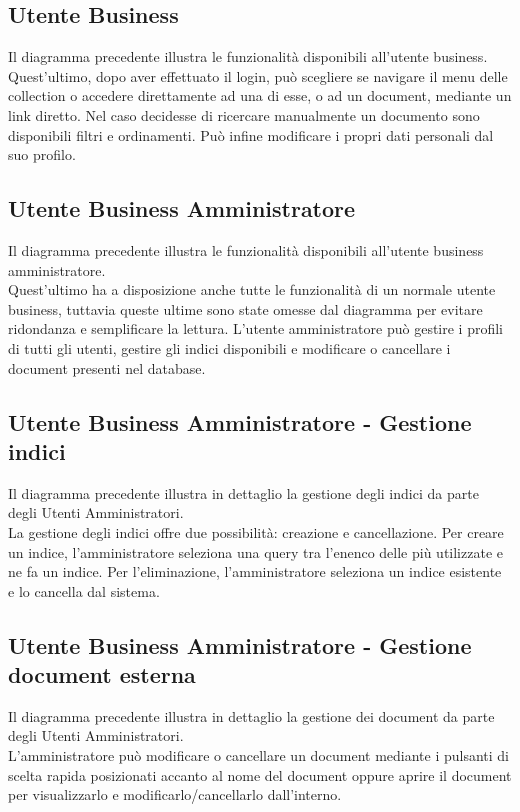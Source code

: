 
\subsection{Utente Business}
Il diagramma precedente illustra le funzionalità disponibili all'utente business.\\
Quest'ultimo, dopo aver effettuato il login, può scegliere se navigare il menu delle collection o accedere direttamente ad una di esse, o ad un document, mediante un link diretto.
Nel caso decidesse di ricercare manualmente un documento sono disponibili filtri e ordinamenti.
Può infine modificare i propri dati personali dal suo profilo.

\subsection{Utente Business Amministratore}
Il diagramma precedente illustra le funzionalità disponibili all'utente business amministratore.\\
Quest'ultimo ha a disposizione anche tutte le funzionalità di un normale utente business, tuttavia queste ultime sono state omesse dal diagramma per evitare ridondanza e semplificare la lettura.
L'utente amministratore può gestire i profili di tutti gli utenti, gestire gli indici disponibili e modificare o cancellare i document presenti nel database.

\subsection{Utente Business Amministratore - Gestione indici}
Il diagramma precedente illustra in dettaglio la gestione degli indici da parte degli Utenti Amministratori.\\
La gestione degli indici offre due possibilità: creazione e cancellazione.
Per creare un indice, l'amministratore seleziona una query tra l'enenco delle più utilizzate e ne fa un indice.
Per l'eliminazione, l'amministratore seleziona un indice esistente e lo cancella dal sistema.

\subsection{Utente Business Amministratore - Gestione document esterna}
Il diagramma precedente illustra in dettaglio la gestione dei document da parte degli Utenti Amministratori.\\
L'amministratore può modificare o cancellare un document mediante i pulsanti di scelta rapida posizionati accanto al nome del document oppure aprire il document per visualizzarlo e modificarlo/cancellarlo dall'interno.


